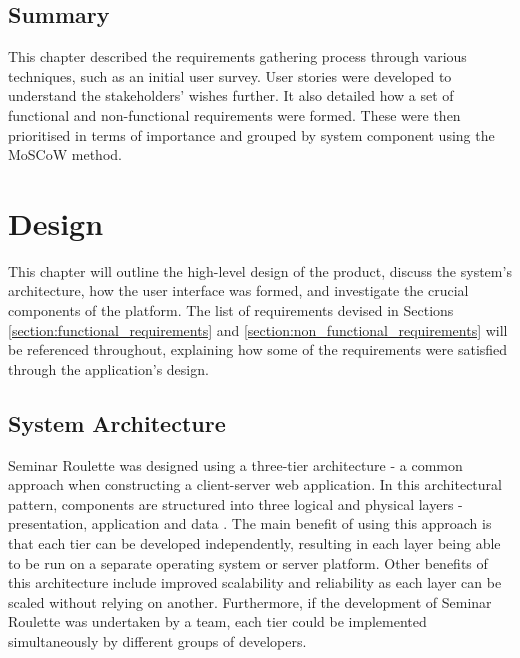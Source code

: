 \documentclass{l4proj}
\begin{document}
\section{Summary}

This chapter described the requirements gathering process through various techniques, such as an initial user survey. User stories were developed to understand the stakeholders' wishes further. It also detailed how a set of functional and non-functional requirements were formed. These were then prioritised in terms of importance and grouped by system component using the MoSCoW method.

\chapter{Design}
\label{chapter:design}

This chapter will outline the high-level design of the product, discuss the system's architecture, how the user interface was formed, and investigate the crucial components of the platform. The list of requirements devised in Sections \ref{section:functional_requirements} and \ref{section:non_functional_requirements} will be referenced throughout, explaining how some of the requirements were satisfied through the application's design.

\section{System Architecture}
\label{section:system_architecture}

Seminar Roulette was designed using a three-tier architecture - a common approach when constructing a client-server web application. In this architectural pattern, components are structured into three logical and physical layers - presentation, application and data \citep{threetierarchitecture}. The main benefit of using this approach is that each tier can be developed independently, resulting in each layer being able to be run on a separate operating system or server platform. Other benefits of this architecture include improved scalability and reliability as each layer can be scaled without relying on another. Furthermore, if the development of Seminar Roulette was undertaken by a team,  each tier could be implemented simultaneously by different groups of developers.
\end{document}
